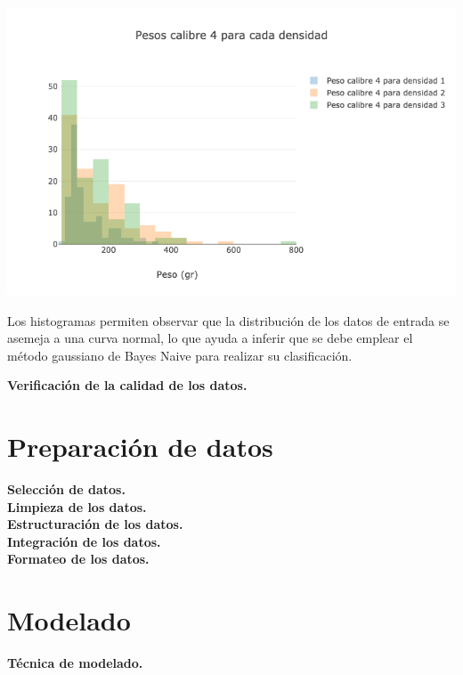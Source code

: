 \begin{center}
\includegraphics[scale=0.6]{PD4.png} 
\end{center}

Los histogramas permiten observar que la distribución de los datos de entrada se asemeja a una curva normal, lo que ayuda a inferir que se debe emplear el método gaussiano de Bayes Naive para realizar su clasificación.

\noindent
\textbf{Verificación de la calidad de los datos.}\\


\section{Preparación de datos}

\noindent
\textbf{Selección de datos.}\\

\noindent
\textbf{Limpieza de los datos.}\\

\noindent
\textbf{Estructuración de los datos.}\\

\noindent
\textbf{Integración de los datos.}\\

\noindent
\textbf{Formateo de los datos.}\\

\section{Modelado}

\noindent
\textbf{Técnica de modelado.}\\

